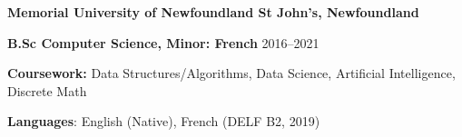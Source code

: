 \textbf{Memorial University of Newfoundland \hfill St John's, Newfoundland} \par

\textbf{B.Sc Computer Science, Minor: French} \hfill 2016--2021\par
\textbf{Coursework:} Data Structures/Algorithms, Data Science, Artificial Intelligence, Discrete Math\par
\textbf{Languages}: English (Native), French (DELF B2, 2019)\par